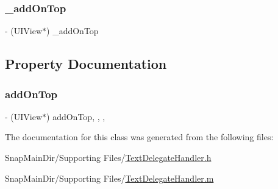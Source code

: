 \subsubsection{\texorpdfstring{\+\_\+add\+On\+Top}{\_addOnTop}}
{\footnotesize\ttfamily -\/ (U\+I\+View$\ast$) \+\_\+add\+On\+Top\hspace{0.3cm}{\ttfamily [protected]}}



\subsection{Property Documentation}
\hypertarget{interface_text_delegate_handler_a8b6cfe02ace3ba068f5e9db1d7d26815}{}\label{interface_text_delegate_handler_a8b6cfe02ace3ba068f5e9db1d7d26815} 
\subsubsection{\texorpdfstring{add\+On\+Top}{addOnTop}}
{\footnotesize\ttfamily -\/ (U\+I\+View$\ast$) add\+On\+Top\hspace{0.3cm}{\ttfamily [read]}, {\ttfamily [write]}, {\ttfamily [nonatomic]}, {\ttfamily [strong]}}



The documentation for this class was generated from the following files\+:\begin{DoxyCompactItemize}
\item 
Snap\+Main\+Dir/\+Supporting Files/\hyperlink{_text_delegate_handler_8h}{Text\+Delegate\+Handler.\+h}\item 
Snap\+Main\+Dir/\+Supporting Files/\hyperlink{_text_delegate_handler_8m}{Text\+Delegate\+Handler.\+m}\end{DoxyCompactItemize}
